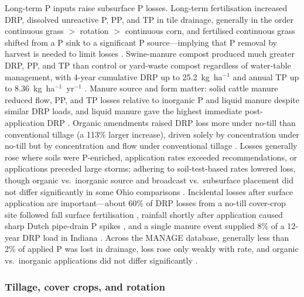 \documentclass[11pt]{article}
\begin{document}
Long-term P inputs raise subsurface P losses. Long-term fertilisation increased DRP, dissolved
unreactive P, PP, and TP in tile drainage, generally in the order continuous grass $>$ rotation
$>$ continuous corn, and fertilised continuous grass shifted from a P sink to a significant P
source---implying that P removal by harvest is needed to limit losses
\parencite{Zhang2015b}. Swine-manure compost produced much greater DRP, PP, and TP than control
or yard-waste compost regardless of water-table management, with 4-year cumulative DRP up to
25.2~kg~ha$^{-1}$ and annual TP up to 8.36~kg~ha$^{-1}$~yr$^{-1}$ \parencite{Zhang2015}. Manure
source and form matter: solid cattle manure reduced flow, PP, and TP losses relative to
inorganic P and liquid manure despite similar DRP loads, and liquid manure gave the highest
immediate post-application DRP \parencite{Wang2018}. Organic amendments raised DRP loss more
under no-till than conventional tillage (a 113\% larger increase), driven solely by
concentration under no-till but by concentration and flow under conventional tillage
\parencite{Zhang2017}. Losses generally rose where soils were P-enriched, application rates
exceeded recommendations, or applications preceded large storms; adhering to soil-test-based
rates lowered loss, though organic vs.\ inorganic source and broadcast vs.\ subsurface placement
did not differ significantly in some Ohio comparisons \parencite{King2018}. Incidental losses
after surface application are important---about 60\% of DRP losses from a no-till cover-crop site
followed fall surface fertilisation \parencite{Macrae2023}, rainfall shortly after application
caused sharp Dutch pipe-drain P spikes \parencite{vanderSalm2012}, and a single manure event
supplied 8\% of a 12-year DRP load in Indiana \parencite{Mumbi2025b}. Across the MANAGE database,
generally less than 2\% of applied P was lost in drainage, loss rose only weakly with rate, and
organic vs.\ inorganic applications did not differ significantly \parencite{Christianson2016}.

\subsubsection{Tillage, cover crops, and rotation}
\end{document}
